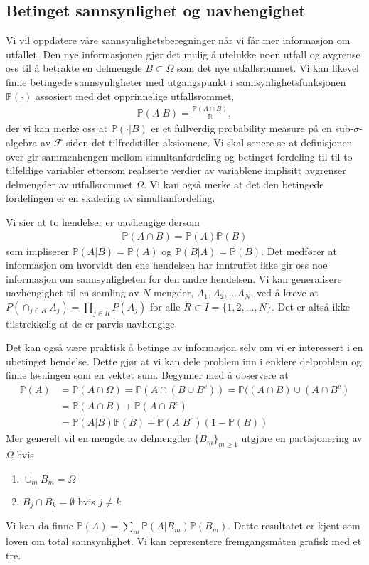 \subsection{Betinget sannsynlighet og uavhengighet}
Vi vil oppdatere våre sannsynlighetsberegninger når vi får mer informasjon om utfallet. Den nye informasjonen gjør det mulig å utelukke noen utfall og avgrense oss til å betrakte en delmengde $B \subset \Omega$ som det nye utfallsrommet. Vi kan likevel finne betingede sannsynligheter med utgangspunkt i sannsynlighetsfunksjonen $\mathbb{P}(\cdot)$ assosiert med det opprinnelige utfallsrommet,
\begin{align}
\mathbb{P}(A|B) = \frac{\mathbb{P}(A\cap B)}{\mathbb{B}},
\end{align}
der vi kan merke oss at  $\mathbb{P}(\cdot | B)$ er et fullverdig probability measure på en sub-$\sigma$-algebra av $\mathcal{F}$ siden det tilfredstiller aksiomene. Vi skal senere se at definisjonen over gir sammenhengen mellom simultanfordeling og betinget fordeling til til to tilfeldige variabler ettersom realiserte verdier av variablene implisitt avgrenser delmengder av utfallsrommet $\Omega$. Vi kan også merke at det den betingede fordelingen er en skalering av simultanfordeling.

Vi sier at to hendelser er uavhengige dersom
\begin{align}
\mathbb{P}(A\cap B)=\mathbb{P}(A)\mathbb{P}(B) 
\end{align}
som impliserer $\mathbb{P}(A|B) = \mathbb{P}(A)$ og $\mathbb{P}(B|A) = \mathbb{P}(B)$. Det medfører at informasjon om hvorvidt den ene hendelsen har inntruffet ikke gir oss noe informasjon om sannsynligheten for den andre hendelsen. Vi kan generalisere uavhengighet til en samling av $N$ mengder, $A_1,A_2,...A_N$, ved å kreve at $P(\cap_{j \in R} A_j) = \prod_{j \in R} P(A_j)$ for alle $R \subset I = \{1,2,...,N\}$. Det er altså ikke tilstrekkelig at de er parvis uavhengige. 

Det kan også være praktisk å betinge av informasjon selv om vi er interessert i en ubetinget hendelse. Dette gjør at vi kan dele problem inn i enklere delproblem og finne løsningen som en vektet sum. Begynner med å observere at
\begin{align}
\mathbb{P}(A) &= \mathbb{P}(A\cap \Omega) = \mathbb{P}(A \cap (B \cup B^c)) = \mathbb{P}((A \cap B) \cup (A \cap B^c) \\
&= \mathbb{P}(A \cap B) + \mathbb{P}(A \cap B^c) \\
&= \mathbb{P}(A|B)\mathbb{P}(B) + \mathbb{P}(A|B^c)(1-\mathbb{P}(B))
\end{align}
Mer generelt vil en mengde av delmengder $\{B_m\}_{m\geq1}$ utgjøre en partisjonering av $\Omega$ hvis
\begin{enumerate}
\item $\cup_m B_m = \Omega$
\item $B_j \cap B_k = \emptyset$ hvis $ j\neq k$
\end{enumerate}
Vi kan da finne $\mathbb{P}(A) = \sum_m \mathbb{P}(A|B_m)\mathbb{P}(B_m)$. Dette resultatet er kjent som loven om total sannsynlighet. Vi kan representere fremgangsmåten grafisk med et tre. 

